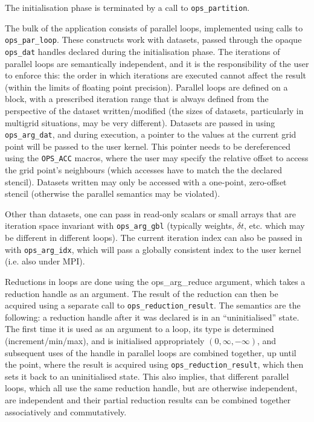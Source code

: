 \documentclass[11pt]{article}
\begin{document}
{The initialisation phase is terminated by a call to {\tt ops\_partition}.

The bulk of the application consists of parallel loops, implemented using calls to {\tt ops\_par\_loop}. These constructs work with datasets, passed through the opaque {\tt ops\_dat} handles declared during the initialisation phase. The iterations of parallel loops are semantically independent, and it is the responsibility of the user to enforce this: the order in which iterations are executed cannot affect the result (within the limits of floating point precision). Parallel loops are defined on a block, with a prescribed iteration range that is always defined from the perspective of the dataset written/modified (the sizes of datasets, particularly in multigrid situations, may be very different). Datasets are passed in using {\tt ops\_arg\_dat}, and during execution, a pointer to the values at the current grid point will be passed to the user kernel. This pointer needs to be dereferenced using the {\tt OPS\_ACC} macros, where the user may specify the relative offset to access the grid point's neighbours (which accesses have to match the the declared stencil). Datasets written may only be accessed with a one-point, zero-offset stencil (otherwise the parallel semantics may be violated).

Other than datasets, one can pass in read-only scalars or small arrays that are iteration space invariant with {\tt ops\_arg\_gbl} (typically weights, $\delta t$, etc. which may be different in different loops). The current iteration index can also be passed in with {\tt ops\_arg\_idx}, which will pass a globally consistent index to the user kernel (i.e. also under MPI).

Reductions in loops are done using the ops\_arg\_reduce argument, which takes a reduction handle as an argument. The result of the reduction can then be acquired using a separate call to {\tt ops\_reduction\_result}. The semantics are the following: a reduction handle after it was declared is in an ``uninitialised'' state. The first time it is used as an argument to a loop, its type is determined (increment/min/max), and is initialised appropriately $(0,\infty,-\infty)$, and subsequent uses of the handle in parallel loops are combined together, up until the point, where the result is acquired using {\tt ops\_reduction\_result}, which then sets it back to an uninitialised state. This also implies, that different parallel loops, which all use the same reduction handle, but are otherwise independent, are independent and their partial reduction results can be combined together associatively and commutatively. 

}
\end{document}
